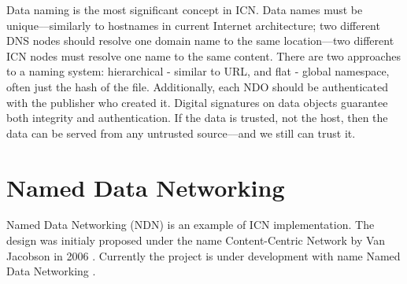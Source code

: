 Data naming is the most significant concept in ICN. Data names must be unique––similarly to hostnames in current Internet architecture; two different DNS nodes should resolve one domain name to the same location––two different ICN nodes must resolve one name to the same content. 
There are two approaches to a naming system: hierarchical - similar to URL, and flat - global namespace, often just the hash of the file.
Additionally, each NDO should be authenticated with the publisher who created it. Digital signatures on data objects guarantee both integrity and authentication. If the data is trusted, not the host, then the data can be served from any untrusted source––and we still can trust it.

\section{Named Data Networking}
Named Data Networking (NDN) is an example of ICN implementation. The design was initialy proposed under the name Content-Centric Network by Van Jacobson in 2006 \cite{4ANewWay38:online}. Currently the project is under development with name Named Data Networking \cite{NamedDat22:online}. 

